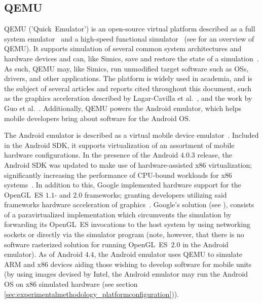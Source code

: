 \subsection{QEMU}
\label{sec:backgroundandrelatedwork_qemu}
QEMU ('Quick~Emulator') is an open-source virtual platform described as a full system emulator~ and a high-speed functional simulator~ (see  for an overview of QEMU).
It supports simulation of several common system architectures and hardware devices and can, like Simics, save and restore the state of a simulation~.
As such, QEMU may, like Simics, run unmodified target software such as OSs, drivers, and other applications.
The platform is widely used in academia, and is the subject of several articles and reports cited throughout this document, such as the graphics acceleration described by Lagar-Cavilla et al.~, and the work by Guo et al.~.
Additionally, QEMU powers the Android emulator, which helps mobile developers bring about software for the Android OS.

The Android emulator is described as a virtual mobile device emulator~.
Included in the Android SDK, it supports virtualization of an assortment of mobile hardware configurations.
In the presence of the Android $4.0.3$ release, the Android SDK was updated to make use of hardware-assisted x86 virtualization; significantly increasing the performance of CPU-bound workloads for x86 systems~.
In addition to this, Google implemented hardware support for the OpenGL~ES $1.1$- and $2.0$ frameworks; granting developers utilizing said frameworks hardware acceleration of graphics~.
Google's solution (see ), consists of a paravirtualized implementation which circumvents the simulation by forwarding its OpenGL~ES invocations to the host system by using networking sockets or directly via the simulator program (note, however, that there is no software rasterized solution for running OpenGL~ES~$2.0$ in the Android emulator).
As of Android $4.4$, the Android emulator uses QEMU to simulate ARM and x86 devices aiding those wishing to develop software for mobile units (by using images devised by Intel\circledR, the Android emulator may run the Android OS on x86 simulated hardware (see section \ref{sec:experimentalmethodology_platformconfiguration})).


